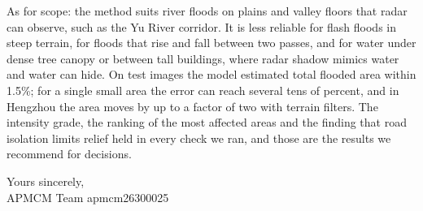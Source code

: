 \documentclass[bwprint]{apmcmthesis}
\renewcommand\thesubsection{\arabic{section}.\arabic{subsection}}
\renewcommand{\thesection}{\Roman{section}}
\begin{document}
As for scope: the method suits river floods on plains and valley floors that radar can observe, such as the Yu River corridor. It is less reliable for flash floods in steep terrain, for floods that rise and fall between two passes, and for water under dense tree canopy or between tall buildings, where radar shadow mimics water and water can hide. On test images the model estimated total flooded area within 1.5\%; for a single small area the error can reach several tens of percent, and in Hengzhou the area moves by up to a factor of two with terrain filters. The intensity grade, the ranking of the most affected areas and the finding that road isolation limits relief held in every check we ran, and those are the results we recommend for decisions.

\medskip

\noindent Yours sincerely,\\
APMCM Team apmcm26300025


\clearpage




\begin{appendices}
\renewcommand\thesubsection{\thesection.\arabic{subsection}}
\renewcommand{\appendixname}{}

\end{appendices}
\end{document}
